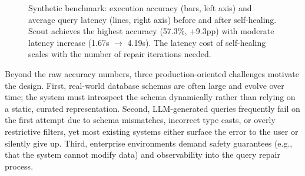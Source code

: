 \documentclass{article}
\begin{document}
\begin{figure}[ht]
{%
}
\caption{Synthetic benchmark: execution accuracy (bars, left axis) and average query latency (lines, right axis) before and after self-healing. Scout achieves the highest accuracy (57.3\%, +9.3pp) with moderate latency increase (1.67s $\to$ 4.19s). The latency cost of self-healing scales with the number of repair iterations needed.}
\label{fig:intro_comparison}
\end{figure}

Beyond the raw accuracy numbers, three production-oriented challenges motivate the design. First, real-world database schemas are often large and evolve over time; the system must introspect the schema dynamically rather than relying on a static, curated representation. Second, LLM-generated queries frequently fail on the first attempt due to schema mismatches, incorrect type casts, or overly restrictive filters, yet most existing systems either surface the error to the user or silently give up. Third, enterprise environments demand safety guarantees (e.g., that the system cannot modify data) and observability into the query repair process.
\end{document}
